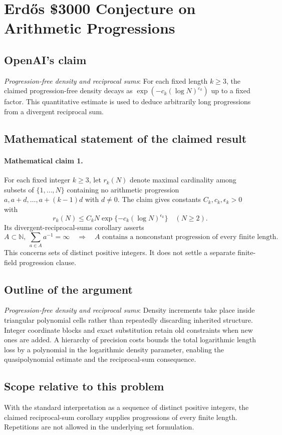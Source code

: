 \documentclass[11pt]{article}
\begin{document}
\section*{Erdős \$3000 Conjecture on Arithmetic Progressions}

\subsection{OpenAI's claim}
\textit{Progression-free density and reciprocal sums}: For each fixed length $k\ge3$, the claimed progression-free density decays as $\exp(-c_k(\log N)^{\varepsilon_k})$ up to a fixed factor. This quantitative estimate is used to deduce arbitrarily long progressions from a divergent reciprocal sum.

\subsection{Mathematical statement of the claimed result}
\paragraph{Mathematical claim 1.} For each fixed integer $k\ge3$, let $r_k(N)$ denote maximal cardinality among subsets of $\{1,\ldots,N\}$ containing no arithmetic progression $a,a+d,\ldots,a+(k-1)d$ with $d\ne0$. The claim gives constants $C_k,c_k,\epsilon_k>0$ with \[r_k(N)\le C_kN\exp\{-c_k(\log N)^{\epsilon_k}\}\quad(N\ge2).\] Its divergent-reciprocal-sums corollary asserts \[A\subset\mathbb N,\ \sum_{a\in A}a^{-1}=\infty\quad\Longrightarrow\quad A\text{ contains a nonconstant progression of every finite length}.\] This concerns sets of distinct positive integers. It does not settle a separate finite-field progression clause.

\subsection{Outline of the argument}
\textit{Progression-free density and reciprocal sums}: Density increments take place inside triangular polynomial cells rather than repeatedly discarding inherited structure. Integer coordinate blocks and exact substitution retain old constraints when new ones are added. A hierarchy of precision costs bounds the total logarithmic length loss by a polynomial in the logarithmic density parameter, enabling the quasipolynomial estimate and the reciprocal-sum consequence.

\subsection{Scope relative to this problem}
With the standard interpretation as a sequence of distinct positive integers, the claimed reciprocal-sum corollary supplies progressions of every finite length. Repetitions are not allowed in the underlying set formulation.
\end{document}
